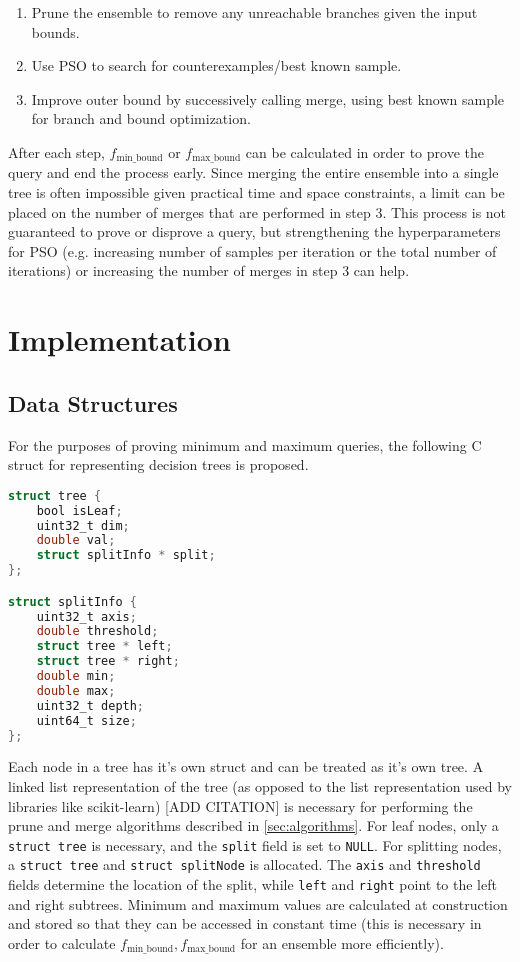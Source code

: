 \documentclass[pageno]{jpaper}
\newcommand{\fminb}{f_{\textrm{min\_bound}}}
\newcommand{\fmaxb}{f_{\textrm{max\_bound}}}
\begin{document}
\begin{doublespacing}
\begin{enumerate}
\item Prune the ensemble to remove any unreachable branches given the input bounds.
\item Use PSO to search for counterexamples/best known sample.
\item Improve outer bound by successively calling merge, using best known sample for branch and bound optimization.
\end{enumerate}

After each step, $\fminb$ or $\fmaxb$ can be calculated in order to prove the query and end the process early. Since merging the entire ensemble into a single tree is often impossible given practical time and space constraints, a limit can be placed on the number of merges that are performed in step 3. This process is not guaranteed to prove or disprove a query, but strengthening the hyperparameters for PSO (e.g. increasing number of samples per iteration or the total number of iterations) or increasing the number of merges in step 3 can help.

\section{Implementation}
\subsection{Data Structures}
\label{sec:data-structures}
For the purposes of proving minimum and maximum queries, the following C struct for representing decision trees is proposed.

{\singlespacing
\begin{lstlisting}[language=C, caption=decision tree data structure, label=lst:c-struct]
struct tree {
    bool isLeaf;
    uint32_t dim;
    double val;
    struct splitInfo * split;
};

struct splitInfo {
    uint32_t axis;
    double threshold;
    struct tree * left;
    struct tree * right;
    double min;
    double max;
    uint32_t depth;
    uint64_t size;
};
\end{lstlisting}
}

Each node in a tree has it's own struct and can be treated as it's own tree. A linked list representation of the tree (as opposed to the list representation used by libraries like scikit-learn) [ADD CITATION] is necessary for performing the prune and merge algorithms described in \autoref{sec:algorithms}. For leaf nodes, only a \verb|struct tree| is necessary, and the \verb|split| field is set to \verb|NULL|. For splitting nodes, a \verb|struct tree| and \verb|struct splitNode| is allocated. The \verb|axis| and \verb|threshold| fields determine the location of the split, while \verb|left| and \verb|right| point to the left and right subtrees. Minimum and maximum values are calculated at construction and stored so that they can be accessed in constant time (this is necessary in order to calculate $\fminb, \fmaxb$ for an ensemble more efficiently).


\end{doublespacing}
\end{document}
